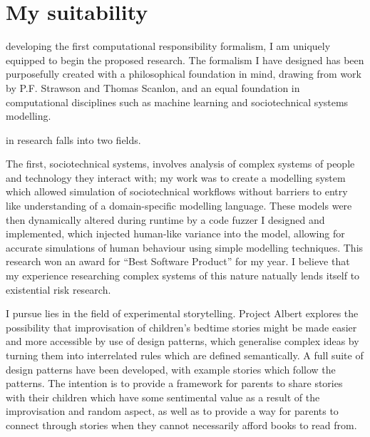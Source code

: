 \section{My suitability}

 developing the first computational responsibility formalism, I am uniquely equipped to begin the proposed research. The formalism I have designed has been purposefully created with a philosophical foundation in mind, drawing from work by P.F. Strawson\cite{freedomandresentment} and Thomas Scanlon\cite{scanlon2006justice}, and an equal foundation in computational disciplines such as machine learning and sociotechnical systems modelling\cite{sommerville_resp_depend}.

 in research falls into two fields. \par

The first, sociotechnical systems, involves analysis of complex systems of people and technology they interact with; my work was to create a modelling system which allowed simulation of sociotechnical workflows without barriers to entry like understanding of a domain-specific modelling language. These models were then dynamically altered during runtime by a code fuzzer I designed and implemented, which injected human-like variance into the model, allowing for accurate simulations of human behaviour using simple modelling techniques. This research won an award for ``Best Software Product'' for my year. I believe that my experience researching complex systems of this nature natually lends itself to existential risk research.\par

 I pursue lies in the field of experimental storytelling. Project Albert explores the possibility that improvisation of children's bedtime stories might be made easier and more accessible by use of design patterns, which generalise complex ideas by turning them into interrelated rules which are defined semantically. A full suite of design patterns have been developed, with example stories which follow the patterns. The intention is to provide a framework for parents to share stories with their children which have some sentimental value as a result of the improvisation and random aspect, as well as to provide a way for parents to connect through stories when they cannot necessarily afford books to read from. 




